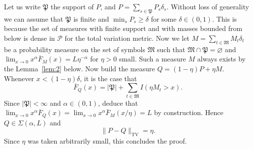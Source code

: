 \documentclass{article}
\newcommand{\1}{\boldsymbol{1}}
\theoremstyle{plain}
\begin{document}
Let us write $\mathfrak{P}$ the support of $P$, and $P = \sum_{s \in \mathfrak{P}}P_s\delta_s$. Without loss of generality we can assume that $\mathfrak{P}$ is finite and $\min_sP_s \geq \delta$ for some $\delta \in (0,1)$. This is because the set of measures with finite support and with masses bounded from below is dense in $\mathcal{P}$ for the total variation metric. Now we let $M = \sum_{t\in \mathfrak{M}}M_t\delta_t$ be a probability measure on the set of symbols $\mathfrak{M}$ such that $\mathfrak{M} \cap \mathfrak{P} = \varnothing$ and $\lim_{x\to 0}x^{\alpha}\bar{F}_M(x) = L \eta^{-\alpha}$ for $\eta>0$ small. Such a measure $M$ always exists by the Lemma~\ref{lem:2} below. Now build the measure $Q = (1-\eta)P + \eta M$. Whenever $x < (1-\eta)\delta$, it is the case that
\begin{equation*}
  \bar{F}_Q(x)%
  =
  |\mathfrak{P}| +  \sum_{t\in \mathfrak{M}}I(\eta M_t > x).
\end{equation*}
Since $|\mathfrak{P}| < \infty$ and $\alpha \in (0,1)$, deduce that $\lim_{x\to 0}x^{\alpha}\bar{F}_Q(x) = \lim_{x \to 0}x^{\alpha}\bar{F}_M(x/\eta) = L$ by construction. Hence $Q\in \Sigma(\alpha,L)$ and
\begin{equation*}
  \|P - Q\|_{\mathrm{TV}}%
  = \eta.
\end{equation*}
Since $\eta$ was taken arbitrarily small, this concludes the proof.
\end{document}
